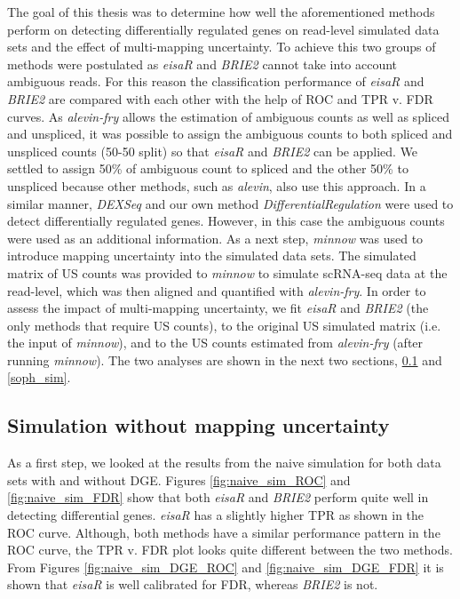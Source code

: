 The goal of this thesis was to determine how well the aforementioned methods perform on detecting differentially regulated genes on read-level simulated data sets and the effect  of multi-mapping uncertainty. To achieve this two groups of methods were postulated as \emph{eisaR} and \emph{BRIE2} cannot take into account ambiguous reads. For this reason the classification performance of \emph{eisaR} and \emph{BRIE2} are compared with each other with the help of ROC and TPR v. FDR curves. As \emph{alevin-fry} allows the estimation of ambiguous counts as well as spliced and unspliced, it was possible to assign the ambiguous counts to both spliced and unspliced counts (50-50 split) so that \emph{eisaR} and \emph{BRIE2} can be applied. We settled to assign 50\% of ambiguous count to spliced and the other 50\% to unspliced because other methods, such as \emph{alevin}, also use this approach. In a similar manner, \emph{DEXSeq} and our own method \emph{DifferentialRegulation} were used to detect differentially regulated genes. However, in this case the ambiguous counts were used as an additional information. As a next step, \emph{minnow} was used to introduce mapping uncertainty into the simulated data sets. The simulated matrix of US counts was provided to \emph{minnow} to simulate scRNA-seq data at the read-level, which was then aligned and quantified with \emph{alevin-fry}. In order to assess the impact of multi-mapping uncertainty, we fit \emph{eisaR} and \emph{BRIE2} (the only methods that require US counts), to the original US simulated matrix (i.e. the input of \emph{minnow}), and to the US counts estimated from \emph{alevin-fry} (after running \emph{minnow}). The two analyses are shown in the next two sections, \ref{naive_sim} and \ref{soph_sim}.

\subsection{Simulation without mapping uncertainty} \label{naive_sim}
As a first step, we looked at the results from the naive simulation for both data sets with and without DGE. Figures \ref{fig:naive_sim_ROC} and \ref{fig:naive_sim_FDR} show that both \emph{eisaR} and \emph{BRIE2} perform quite well in detecting differential genes. \emph{eisaR} has a slightly higher TPR as shown in the ROC curve. Although, both methods have a similar performance pattern in the ROC curve, the TPR v. FDR plot looks quite different between the two methods. From Figures \ref{fig:naive_sim_DGE_ROC} and \ref{fig:naive_sim_DGE_FDR} it is shown that \emph{eisaR} is well calibrated for FDR, whereas \emph{BRIE2} is not.

